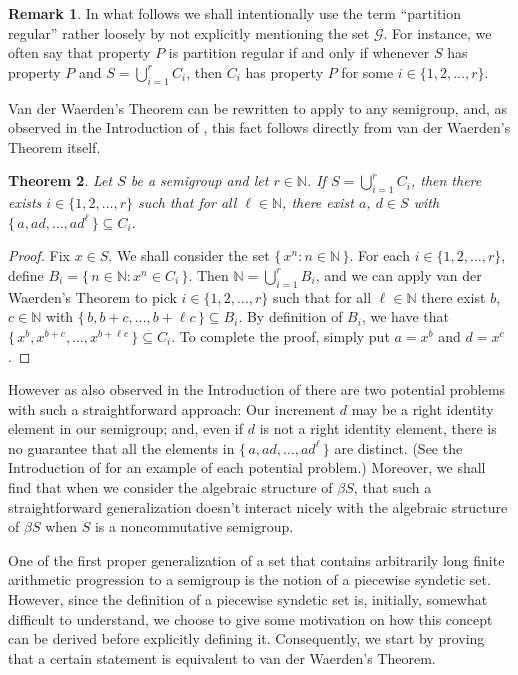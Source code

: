 \documentclass[12pt]{article}
\theoremstyle{plain}
\newtheorem{thm}{Theorem}[section]
\theoremstyle{definition}
\newtheorem{rmk}[thm]{Remark}
\newcommand{\bbN}{\mathbb{N}}
\newcommand{\calG}{\mathcal{G}}
\begin{document}
\begin{rmk}
  In what follows we shall intentionally use the term ``partition
  regular'' rather loosely by not explicitly mentioning the set
  $\calG$. 
  For instance, we often say that property $P$ is partition regular if
  and only if whenever $S$ has property $P$ and $S = \bigcup_{i=1}^r
  C_i$, then $C_i$ has property $P$ for some $i \in \{1, 2, \ldots,
  r\}$. 
\end{rmk}


Van der Waerden's Theorem can be rewritten to apply to any semigroup,
and, as observed in the Introduction of \cite{Bergelson:1992fk}, this
fact follows directly from van der Waerden's Theorem itself.

\begin{thm}
  Let $S$ be a semigroup and let $r \in \bbN$.
  If $S = \bigcup_{i=1}^r C_i$, then there exists $i \in \{1, 2,
  \ldots, r\}$ such that for all $\ell \in \bbN$, there exist $a$, $d
  \in S$ with $\{\, a , ad, \ldots, ad^\ell \,\} \subseteq C_i$. 
\end{thm}
\begin{proof}
  Fix $x \in S$.
  We shall consider the set $\{\, x^n : n \in \bbN \,\}$.
  For each $i \in \{1, 2, \ldots, r\}$, define $B_i = \{\, n \in \bbN
  : x^n \in C_i \,\}$.
  Then $\bbN = \bigcup_{i=1}^r B_i$, and we can apply van der
  Waerden's Theorem to pick $i \in \{1, 2, \ldots, r\}$ such that for
  all $\ell \in \bbN$ there exist $b$, $c \in \bbN$ with $\{\, b, b+c,
  \ldots, b+\ell c \,\} \subseteq B_i$. 
  By definition of $B_i$, we have that $\{\, x^b, x^{b+c}, \ldots,
  x^{b+ \ell c} \,\} \subseteq C_i$. 
  To complete the proof, simply put $a = x^b$ and $d = x^c$. 
\end{proof}

However as also observed in the Introduction of
\cite{Bergelson:1992fk} there are two potential problems with such a
straightforward approach:
Our increment $d$ may be a right identity element in our semigroup;
and, even if $d$ is not a right identity element, there is no
guarantee that all the elements in $\{\, a, ad, \ldots, ad^{\ell}
\,\}$ are distinct. 
(See the Introduction of \cite{Bergelson:1992fk} for an example of
each potential problem.)
Moreover, we shall find that when we consider the algebraic structure
of $\beta S$, that such a straightforward generalization doesn't
interact nicely with the algebraic structure of $\beta S$ when $S$ is
a noncommutative semigroup. 

One of the first proper generalization of a set that contains
arbitrarily long finite arithmetic progression to a semigroup is the
notion of a piecewise syndetic set. 
However, since the definition of a piecewise syndetic set is, initially,
somewhat difficult to understand, we choose to give some 
motivation on how this concept can be derived before explicitly
defining it. 
Consequently, we start by proving that a certain statement is
equivalent to van der Waerden's Theorem. 
\end{document}
